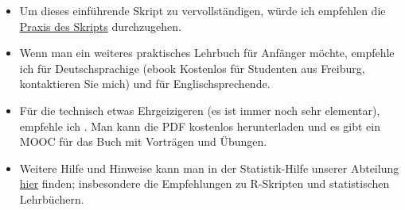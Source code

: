 \documentclass[a4paper,twoside]{tufte-book}\usepackage[]{graphicx}\usepackage[]{color}
\begin{document}
\begin{itemize}

\item Um dieses einführende Skript zu vervollständigen, würde ich empfehlen die \href{https://github.com/florianhartig/ResearchSkills/tree/master/Labs/Statistics}{Praxis des Skripts} durchzugehen.

\item Wenn man ein weiteres praktisches Lehrbuch für Anfänger möchte, empfehle ich \citet{Dormann-ParametrischeStatistik-2013} für Deutschsprachige (ebook Kostenlos für Studenten aus Freiburg, kontaktieren Sie mich) und \citet{Gotelli-PrimerEcologicalStatistics-2004} für Englischsprechende. 

\item Für die technisch etwas Ehrgeizigeren (es ist immer noch sehr elementar), empfehle ich \citet{James-IntroductiontoStatistical-2013}. Man kann die PDF kostenlos herunterladen und es gibt ein MOOC für das Buch mit Vorträgen und Übungen.

\item Weitere Hilfe und Hinweise kann man in der Statistik-Hilfe unserer Abteilung  \href{http://biometry.github.io/APES/}{hier} finden; insbesondere die Empfehlungen zu R-Skripten und statistischen Lehrbüchern.

\end{itemize}






\end{document}
